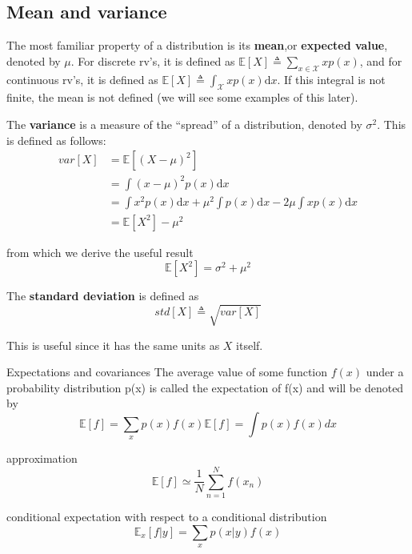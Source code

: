 \subsection{Mean and variance}
The most familiar property of a distribution is its \textbf{mean},or \textbf{expected value}, denoted by $\mu$. For discrete rv’s, it is defined as $\mathbb{E}[X] \triangleq \sum_{x \in \mathcal{X}}xp(x)$, and for continuous rv’s, it is defined as $\mathbb{E}[X] \triangleq \int_{\mathcal{X}}xp(x)\mathrm{d}x$. If this integral is not finite, the mean is not defined (we will see some examples of this later). 

The \textbf{variance} is a measure of the “spread” of a distribution, denoted by $\sigma^2$. This is defined as follows:
\begin{align}
var[X]& =\mathbb{E}[(X-\mu)^2] \\
      & =\int{(x-\mu)^2p(x)\mathrm{d}x} \nonumber \\
      & =\int{x^2p(x)\mathrm{d}x}+{\mu}^2\int{p(x)\mathrm{d}x}-2\mu\int{xp(x)\mathrm{d}x} \nonumber \\
	  & =\mathbb{E}[X^2]-{\mu}^2
\end{align}

from which we derive the useful result
\begin{equation}
\mathbb{E}[X^2]=\sigma^2+{\mu}^2
\end{equation}

The \textbf{standard deviation} is defined as
\begin{equation}
std[X] \triangleq \sqrt{var[X]}
\end{equation}

This is useful since it has the same units as $X$ itself.

Expectations and covariances
The average value of some function $f(x)$ under a probability distribution p(x) is called the expectation of f(x) and
will be denoted by 
\begin{equation}
                                  \mathbb{E}[f] = \sum_{x}p(x)f(x)
                                  \mathbb{E}[f] = \int p(x)f(x)dx
\end{equation}

approximation
\begin{equation}
\mathbb{E}[f] \simeq \frac{1}{N}\sum_{n=1}^{N}{f(x_n)}
\end{equation}
                                  
conditional expectation with respect to a conditional distribution                                
\begin{equation}
\mathbb{E}_x[f|y] = \sum_{x}p(x|y)f(x)
\end{equation}

